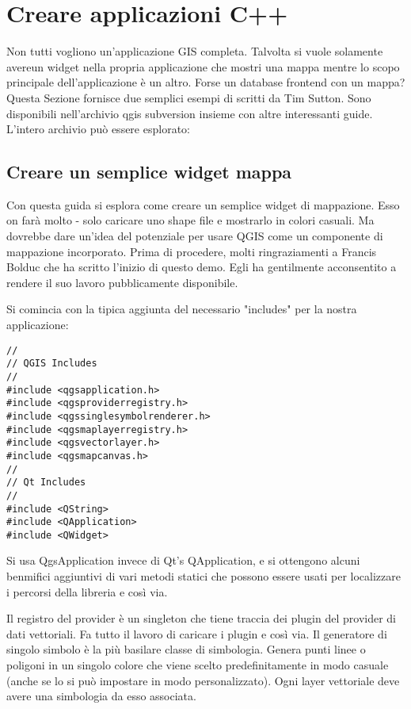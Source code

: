  \section{Creare applicazioni C++}

Non tutti vogliono un'applicazione GIS completa. Talvolta si vuole solamente avereun widget nella propria applicazione che mostri una mappa mentre lo scopo principale dell'applicazione è un altro. Forse un database frontend con un mappa? Questa Sezione fornisce due semplici esempi di scritti da Tim Sutton.
Sono disponibili nell'archivio qgis subversion insieme con altre interessanti guide. L'intero archivio può essere esplorato: 

\subsection{Creare un semplice widget mappa}\label{subsec:simple_widget}

Con questa guida si esplora come creare un semplice widget di mappazione. Esso on farà molto - solo caricare uno shape file e mostrarlo in colori casuali. Ma dovrebbe dare un'idea del potenziale per usare QGIS come un componente di mappazione incorporato. Prima di procedere, molti ringraziamenti a Francis Bolduc che ha scritto l'inizio di questo demo. Egli ha gentilmente acconsentito a rendere il suo lavoro pubblicamente disponibile.

Si comincia con la tipica aggiunta del necessario "includes" per la nostra applicazione:

\begin{verbatim}
//
// QGIS Includes
//
#include <qgsapplication.h>
#include <qgsproviderregistry.h>
#include <qgssinglesymbolrenderer.h>
#include <qgsmaplayerregistry.h>
#include <qgsvectorlayer.h>
#include <qgsmapcanvas.h>
//
// Qt Includes
//
#include <QString>
#include <QApplication>
#include <QWidget>
\end{verbatim}

Si usa QgsApplication invece di Qt's QApplication, e si ottengono alcuni benmifici aggiuntivi di vari metodi statici che possono essere usati per localizzare i percorsi della libreria e così via.

Il registro del provider è un singleton che tiene traccia dei plugin del provider di dati vettoriali. Fa tutto il lavoro di caricare i plugin e così via. Il generatore di singolo simbolo è la più basilare classe di simbologia. Genera punti linee o poligoni in un singolo colore che viene scelto predefinitamente in modo casuale (anche se lo si può impostare in modo personalizzato). Ogni layer vettoriale deve avere una simbologia da esso associata.

